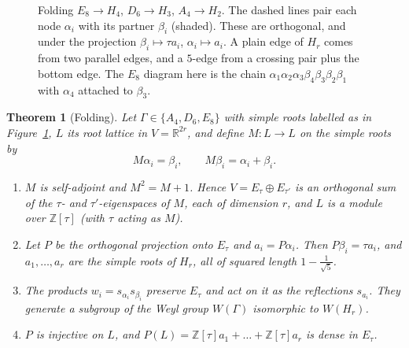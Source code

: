 \documentclass[11pt,openany]{book}
\theoremstyle{plain}
\newtheorem{theorem}{Theorem}[chapter]
\theoremstyle{definition}
\theoremstyle{remark}
\newcommand{\R}{\mathbb{R}}
\newcommand{\Z}{\mathbb{Z}}
\begin{document}
\begin{figure}[ht]
\caption{Folding $E_8\to H_4$, $D_6\to H_3$, $A_4\to H_2$. The dashed lines pair each node $\alpha_i$
with its partner $\beta_i$ (shaded). These are orthogonal, and under the projection
$\beta_i\mapsto\tau a_i$, $\alpha_i\mapsto a_i$. A plain edge of $H_r$ comes from two parallel edges, and a
$5$-edge from a crossing pair plus the bottom edge. The $E_8$ diagram here is the chain
$\alpha_1\alpha_2\alpha_3\beta_4\beta_3\beta_2\beta_1$ with $\alpha_4$ attached to $\beta_3$.}
\label{ERG:fig:fold}
\end{figure}

\begin{theorem}[Folding]\label{ERG:thm:fold}
Let $\Gamma\in\{A_4,D_6,E_8\}$ with simple roots labelled as in Figure~\ref{ERG:fig:fold}, $L$ its root
lattice in $V=\R^{2r}$, and define $M\colon L\to L$ on the simple roots by
\[
  M\alpha_i=\beta_i,\qquad M\beta_i=\alpha_i+\beta_i .
\]
\begin{enumerate}[nosep]
\item $M$ is self-adjoint and $M^2=M+1$. Hence $V=E_\tau\oplus E_{\tau'}$ is an orthogonal sum of the
  $\tau$- and $\tau'$-eigenspaces of $M$, each of dimension $r$, and $L$ is a module over
  $\Z[\tau]$ (with $\tau$ acting as $M$).
\item Let $P$ be the orthogonal projection onto $E_\tau$ and $a_i=P\alpha_i$. Then $P\beta_i=\tau a_i$, and
  $a_1,\dots,a_r$ are the simple roots of $H_r$, all of squared length $1-\frac1{\sqrt5}$.
\item The products $w_i=s_{\alpha_i}s_{\beta_i}$ preserve $E_\tau$ and act on it as the reflections
  $s_{a_i}$. They generate a subgroup of the Weyl group $W(\Gamma)$ isomorphic to $W(H_r)$.
\item $P$ is injective on $L$, and $P(L)=\Z[\tau]a_1+\dots+\Z[\tau]a_r$ is dense in $E_\tau$.
\end{enumerate}
\end{theorem}
\end{document}
